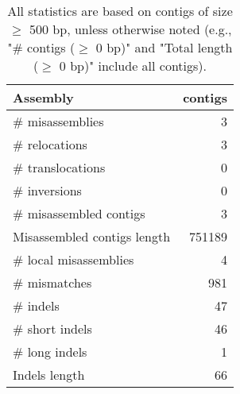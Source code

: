 \documentclass[12pt,a4paper]{article}
\begin{document}
\begin{table}[ht]
\begin{center}
\caption{All statistics are based on contigs of size $\geq$ 500 bp, unless otherwise noted (e.g., "\# contigs ($\geq$ 0 bp)" and "Total length ($\geq$ 0 bp)" include all contigs).}
\begin{tabular}{|l*{1}{|r}|}
\hline
Assembly & contigs \\ \hline
\# misassemblies & 3 \\ \hline
\hspace{5mm}\# relocations & 3 \\ \hline
\hspace{5mm}\# translocations & 0 \\ \hline
\hspace{5mm}\# inversions & 0 \\ \hline
\# misassembled contigs & 3 \\ \hline
Misassembled contigs length & 751189 \\ \hline
\# local misassemblies & 4 \\ \hline
\# mismatches & 981 \\ \hline
\# indels & 47 \\ \hline
\hspace{5mm}\# short indels & 46 \\ \hline
\hspace{5mm}\# long indels & 1 \\ \hline
Indels length & 66 \\ \hline
\end{tabular}
\end{center}
\end{table}
\end{document}
